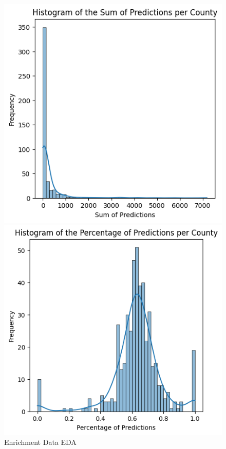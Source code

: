 \begin{figure}[h]
    \centering
    \caption{Enrichment Data EDA}
    \begin{minipage}{0.33\textwidth}
        \centering
        \includegraphics[width=\textwidth]{images/geo_enrich/predictions_per_county.png}
    \end{minipage}\hfill
    \begin{minipage}{0.33\textwidth}
        \centering
        \includegraphics[width=\textwidth]{images/geo_enrich/perc_predictions.png}

\end{minipage}
\end{figure}
